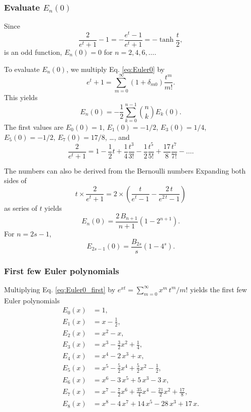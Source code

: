 \documentclass[aip,jcp,preprint,notitlepage, superscriptaddress]{revtex4-1}
\begin{document}
\subsubsection{Evaluate $E_n(0)$}



Since
\[
\frac{ 2 } {e^t + 1} - 1
=
-\frac{ e^t - 1 } {e^t + 1}
=
-\tanh \frac t 2,
\]
is an odd function,
$E_{n}(0) = 0$
for $n = 2, 4, 6, \dots$.



To evaluate $E_n(0)$,
we multiply Eq. \eqref{eq:Euler0}
by
\[
e^t + 1
=
\sum_{m = 0}^\infty
  (1 + \delta_{m0}) \frac{ t^m }{ m! }.
\]
This yields
\[
E_n(0)
=
-\frac{1}{2}
\sum_{k = 0}^{n - 1}
{n \choose k} E_k(0).
\]
The first values are
$E_0(0) = 1$,
$E_1(0) = -1/2$,
$E_3(0) = 1/4$,
$E_5(0) = -1/2$,
$E_7(0) = 17/8$,
\dots,
%
and
%
\begin{equation}
\frac 2 {e^t + 1}
=
1 - \frac 1 2 t
+ \frac 1 4 \frac{ t^3 }{ 3! }
- \frac 1 2 \frac{ t^5 }{ 5! }
+ \frac{ 17 }{ 8 } \frac{ t^7 }{ 7! }
- \dots.
\label{eq:Euler0_first}
\end{equation}


The numbers can also be derived from the Bernoulli numbers
%
Expanding both sides of
\[
t \times \frac{ 2 }{ e^t + 1}
=
2 \times \left(
  \frac{ t }{ e^t - 1 }
  -
  \frac{ 2 \, t } { e^{2 \, t} - 1 }
\right)
\]
as series of $t$ yields
\[
E_n(0)
=
\frac{ 2 \, B_{n + 1} } { n + 1 }
\left( 1 - 2^{n + 1} \right).
\]
%
For $n = 2 s - 1$,
\[
E_{2 s - 1}(0)
=
\frac{ B_{2 s} } { s }
\left( 1 - 4^s \right).
\]



\subsubsection{First few Euler polynomials}




Multiplying Eq. \eqref{eq:Euler0_first}
by $e^{x t} = \sum_{m = 0}^\infty x^m \, t^m/m!$ yields
the first few Euler polynomials\cite{
abramowitz, wang_specfunc}
\begin{align*}
  E_0(x) &= 1, \\
  E_1(x) &= x -\frac 1 2, \\
  E_2(x) &= x^2 - x, \\
  E_3(x) &= x^3 - \frac 3 2 x^2 + \frac 1 4, \\
  E_4(x) &= x^4 - 2 \, x^3  + x, \\
  E_5(x) &= x^5 - \frac 5 2 x^4 + \frac 5 2 x^2 -\frac 1 2, \\
  E_6(x) &= x^6 - 3 \, x^5 + 5 \, x^3 - 3 \, x, \\
  E_7(x) &= x^7 - \frac 7 2 x^6 + \frac{35}{4} x^4 - \frac{21}{2} x^2 + \frac{ 17 } 8, \\
  E_8(x) &= x^8 - 4 \, x^7 + 14 \, x^5 - 28 \, x^3 + 17 \, x.
\end{align*}
\end{document}
